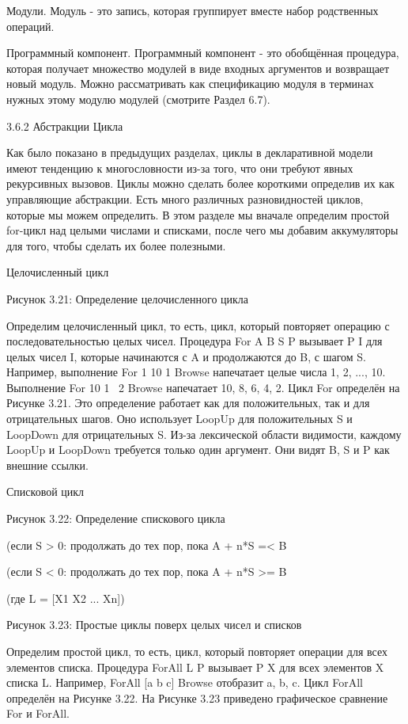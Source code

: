 Модули. Модуль - это запись, которая группирует вместе набор родственных операций.

Программный компонент. Программный компонент - это обобщённая процедура, которая получает множество модулей в виде входных аргументов и возвращает новый модуль. Можно рассматривать как спецификацию модуля в терминах нужных этому модулю модулей (смотрите Раздел 6.7).

3.6.2 Абстракции Цикла

Как было показано в предыдущих разделах, циклы в декларативной модели имеют тенденцию к многословности из-за того, что они требуют явных рекурсивных вызовов. Циклы можно сделать более короткими определив их как управляющие абстракции. Есть много различных разновидностей циклов, которые мы можем определить. В этом разделе мы вначале определим простой for-цикл над целыми числами и списками, после чего мы добавим аккумуляторы для того, чтобы сделать их более полезными.

Целочисленный цикл

Рисунок 3.21: Определение целочисленного цикла

Определим целочисленный цикл, то есть, цикл, который повторяет операцию с последовательностью целых чисел. Процедура {For A B S P} вызывает {P I} для целых чисел I, которые начинаются с A и продолжаются до B, с шагом S. Например, выполнение {For 1 10 1 Browse} напечатает целые числа 1, 2, ..., 10. Выполнение {For 10 1 ~2 Browse} напечатает 10, 8, 6, 4, 2. Цикл For определён на Рисунке 3.21. Это определение работает как для положительных, так и для отрицательных шагов. Оно использует LoopUp для положительных S и LoopDown для отрицательных S. Из-за лексической области видимости, каждому LoopUp и LoopDown требуется только один аргумент. Они видят B, S и P как внешние ссылки.

Списковой цикл

Рисунок 3.22: Определение спискового цикла

(если S > 0: продолжать до тех пор, пока A + n*S =< B

(если S < 0: продолжать до тех пор, пока A + n*S >= B

(где L = [X1 X2 ... Xn])

Рисунок 3.23: Простые циклы поверх целых чисел и списков

Определим простой цикл, то есть, цикл, который повторяет операции для всех элементов списка. Процедура {ForAll L P} вызывает {P X} для всех элементов X списка L. Например, {ForAll [a b c] Browse} отобразит a, b, c. Цикл ForAll определён на Рисунке 3.22. На Рисунке 3.23 приведено графическое сравнение For и ForAll.

